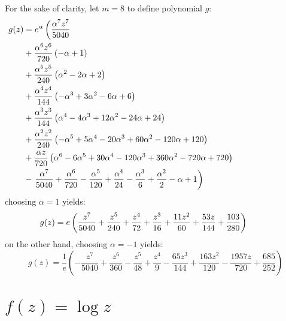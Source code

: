 For the sake of clarity, let $m=8$ to define polynomial $g$:
\begin{displaymath}
\hspace{-3cm}
\begin{split}
g{\left (z \right )} &= e^{\alpha}\left(\frac{\alpha^{7} z^{7}}{5040}\right. \\
&+ \frac{\alpha^{6} z^{6}}{720} \left(- \alpha + 1\right) \\
&+ \frac{\alpha^{5} z^{5}}{240} \left(\alpha^{2} - 2 \alpha + 2\right) \\
&+ \frac{\alpha^{4} z^{4}}{144} \left(- \alpha^{3} + 3 \alpha^{2} - 6 \alpha + 6\right) \\
&+ \frac{\alpha^{3} z^{3}}{144} \left(\alpha^{4} - 4 \alpha^{3} + 12 \alpha^{2} - 24 \alpha + 24\right) \\
&+ \frac{\alpha^{2} z^{2}}{240} \left(- \alpha^{5} + 5 \alpha^{4} - 20 \alpha^{3} + 60 \alpha^{2} - 120 \alpha + 120\right) \\
&+ \frac{\alpha z}{720} \left(\alpha^{6} - 6 \alpha^{5} + 30 \alpha^{4} - 120 \alpha^{3} + 360 \alpha^{2} - 720 \alpha + 720\right) \\
&- \left.\frac{\alpha^{7}}{5040} + \frac{\alpha^{6}}{720} - \frac{\alpha^{5}}{120} + \frac{\alpha^{4}}{24} - \frac{\alpha^{3}}{6} + \frac{\alpha^{2}}{2} -\alpha + 1\right) 
\end{split}
\end{displaymath}
choosing $\alpha=1$ yields:
\begin{displaymath}
\hspace{-1cm}
g{\left (z \right )} = e \left(\frac{z^{7}}{5040} + \frac{z^{5}}{240} + \frac{z^{4}}{72} + \frac{z^{3}}{16} + \frac{11 z^{2}}{60} + \frac{53 z}{144} + \frac{103}{280}\right)
\end{displaymath}
on the other hand, choosing $\alpha=-1$ yields:
\begin{displaymath}
g{\left (z \right )} = \frac{1}{e} \left( - \frac{z^{7}}{5040} + \frac{z^{6}}{360} - \frac{z^{5}}{48} + \frac{z^{4}}{9}\right. - \left.\frac{65 z^{3}}{144} + \frac{163 z^{2}}{120} - \frac{1957 z}{720} + \frac{685}{252}\right)
\end{displaymath}


\section{$f(z)=\log{z}$}

